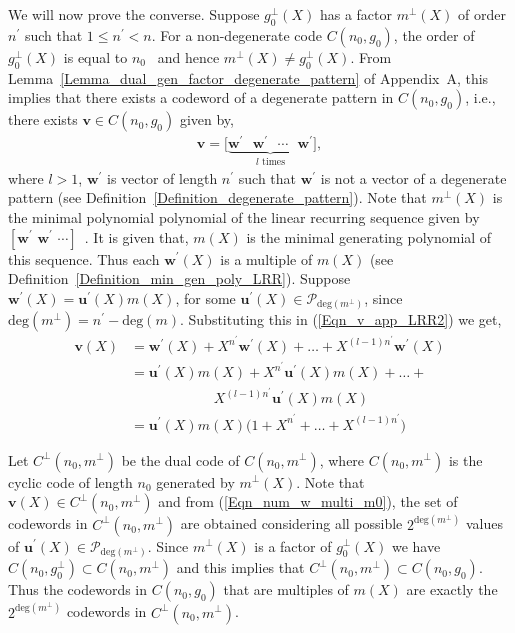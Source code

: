 \documentclass[10pt,journal]{IEEEtran}
\def \deg{{\mathrm{deg}}}
\begin{document}
We will now prove the converse. 
Suppose $g_0^{\perp}(X)$ has a factor $m^{\perp}(X)$ of order $n^{\prime}$ such that $1 \leq n^{\prime} < n$.
For a non-degenerate code $C(n_0,g_0)$, the order of $g_0^{\perp}(X)$ is equal to $n_0$~\cite[Sec.~8.3]{Macwilliams_Sloane_1977} 
and hence $m^{\perp}(X) \neq g_0^{\perp}(X)$.
% 
From Lemma~\ref{Lemma_dual_gen_factor_degenerate_pattern} of Appendix~A, this implies that there exists a 
codeword of a degenerate pattern in $C(n_0,g_0)$, i.e., there exists
$\mathbf{v} \in C(n_0,g_0)$ given by,
% 
\begin{align}
% 
\mathbf{v} = \Big[\underbrace{\mathbf{w}^{\prime} \mbox{~~} \mathbf{w}^{\prime} \mbox{~~} \cdots \mbox{~~} \mathbf{w}^{\prime}}_{l \text{ times}}\Big],
\label{Eqn_v_app_LRR2}
% 
\end{align}
% 
where $l > 1$, $\mathbf{w}^{\prime}$ is vector of length $n^{\prime}$ such that $\mathbf{w}^{\prime}$ is not a vector of 
a degenerate pattern (see Definition~\ref{Definition_degenerate_pattern}).
Note that $m^{\perp}(X)$ is the minimal polynomial polynomial of the linear recurring sequence
given by $[\mathbf{w}^{\prime} \mbox{~} \mathbf{w}^{\prime} \mbox{~} \cdots]$~\cite[Sec.~8.3]{Macwilliams_Sloane_1977}. 
It is given that, $m(X)$ is the minimal generating polynomial of this sequence.
Thus each $\mathbf{w}^{\prime}(X)$ is a multiple of $m(X)$ (see Definition~\ref{Definition_min_gen_poly_LRR}).
% 
Suppose $\mathbf{w}^{\prime}(X) = \mathbf{u}^{\prime}(X) m(X)$, for some $\mathbf{u}^{\prime}(X) \in \mathcal{P}_{\deg(m^{\perp})}$,
since $\deg(m^{\perp}) = n^{\prime}-\deg(m)$.
Substituting this in (\ref{Eqn_v_app_LRR2}) we get,
% 
\begin{align}
%  
\mathbf{v}(X) &= \mathbf{w}^{\prime}(X) + X^{n^{\prime}}\mathbf{w}^{\prime}(X) + \ldots + X^{(l-1)n^{\prime}}\mathbf{w}^{\prime}(X) \\
	      &= \mathbf{u}^{\prime}(X) m(X) + X^{n^{\prime}}\mathbf{u}^{\prime}(X) m(X) + \ldots + \nonumber \\
	      &\mbox{~~~~~~~~~~~~~~~~~~} X^{(l-1)n^{\prime}}\mathbf{u}^{\prime}(X) m(X) \\	    
	      &= \mathbf{u}^{\prime}(X) m(X) \Big( 1+ X^{n^{\prime}} + \ldots + X^{(l-1)n^{\prime}} \Big)
\label{Eqn_num_w_multi_m0}	      
% 
\end{align}
% 

Let $C^{\perp}(n_0,m^{\perp})$ be the dual code of $C(n_0,m^{\perp})$, 
where $C(n_0,m^{\perp})$ is the cyclic code of length $n_0$ generated by $m^{\perp}(X)$. 
Note that $\mathbf{v}(X) \in C^{\perp}(n_0,m^{\perp})$ and from (\ref{Eqn_num_w_multi_m0}), 
the set of codewords in $C^{\perp}(n_0,m^{\perp})$ are obtained considering all possible $2^{\deg(m^{\perp})}$ 
values of $\mathbf{u}^{\prime}(X) \in \mathcal{P}_{\deg(m^{\perp})}$.
% 
Since $m^{\perp}(X)$ is a factor of $g_0^{\perp}(X)$ we have 
$C(n_0,g_0^{\perp}) \subset C(n_0,m^{\perp})$ and this implies that
$C^{\perp}(n_0,m^{\perp}) \subset C(n_0,g_0)$.
% 
Thus the codewords in $C(n_0,g_0)$ that are multiples of $m(X)$ are exactly the $2^{\deg(m^{\perp})}$ codewords
in $C^{\perp}(n_0,m^{\perp})$. 
\end{document}
